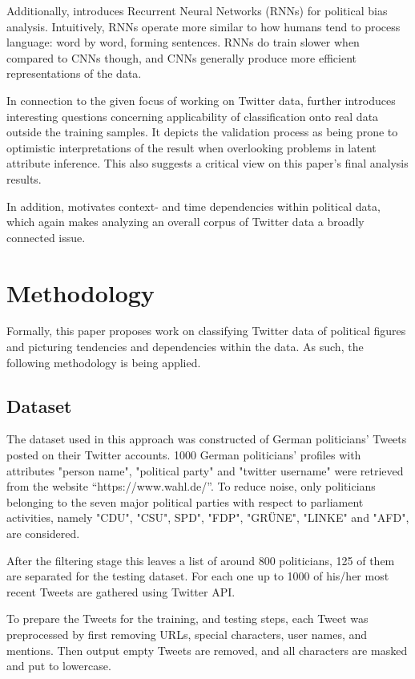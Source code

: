 \documentclass[10pt, oneside]{article}
\begin{document}
\begin{multicols}{2}
Additionally, \cite{Misra2016} introduces Recurrent Neural Networks (RNNs) for political bias analysis. Intuitively, RNNs operate more similar to how humans tend to process language: word by word, forming sentences. RNNs do train slower when compared to CNNs though, and CNNs generally produce more efficient representations of the data.

In connection to the given focus of working on Twitter data, \cite{Cohen2013} further introduces interesting questions concerning applicability of classification onto real data outside the training samples. It depicts the validation process as being prone to optimistic interpretations of the result when overlooking problems in latent attribute inference. This also suggests a critical view on this paper's final analysis results. 

In addition, \cite{SuggestedAdditionalResource2018} motivates context- and time dependencies within political data, which again makes analyzing an overall corpus of Twitter data a broadly connected issue.


\section{Methodology}

Formally, this paper proposes work on classifying Twitter data of political figures and picturing tendencies and dependencies within the data. As such, the following methodology is being applied. 

\subsection{Dataset} 

The dataset used in this approach was constructed of German politicians' Tweets posted on their Twitter accounts. 1000 German politicians' profiles with attributes "person name", "political party" and "twitter username" were retrieved from the website “https://www.wahl.de/”.
To reduce noise, only politicians belonging to the seven major political parties with respect to parliament activities, namely "CDU", "CSU", SPD", "FDP", "GRÜNE", "LINKE" and "AFD", are considered.

After the filtering stage this leaves a list of around 800 politicians, 125 of them are separated for the testing dataset. For each one up to 1000 of his/her most recent Tweets are gathered using Twitter API.

To prepare the Tweets for the training, and testing steps, each Tweet was preprocessed by first removing URLs, special characters, user names, and mentions. Then output empty Tweets are removed, and all characters are masked and put to lowercase.


\end{multicols}
\end{document}
